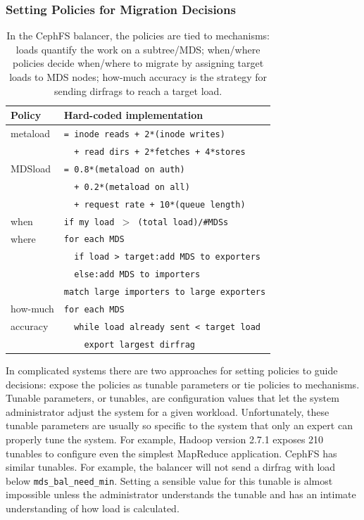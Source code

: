 \subsubsection{Setting Policies for Migration Decisions}
\label{setting-policies-for-migration-decisions}
\begin{table}[tb]
	\centering
	\begin{tabular}{ >{}p{1.5cm} | >{}p{6.8cm}}
		\centering\textbf{Policy} & \centering\textbf{Hard-coded implementation}
		\tabularnewline\hline		
		metaload	 	& \small{\texttt{= inode reads + 2*(inode writes)}}\tabularnewline
					 	& \small{\texttt{~~+ read dirs + 2*fetches + 4*stores}}\tabularnewline        
		MDSload      	& \small{\texttt{= 0.8*(metaload on auth)}}\tabularnewline
        				& \small{\texttt{~~+ 0.2*(metaload on all)}}\tabularnewline
        				& \small{\texttt{~~+ request rate + 10*(queue length)}}\tabularnewline
		when			& \small{\texttt{if my load \(>\) (total load)/\#MDSs}}\tabularnewline
        
		where			& \small{\texttt{for each MDS}}\tabularnewline	
          			& \small{\texttt{~~if load > target:add MDS to exporters}}
		\tabularnewline	& \small{\texttt{~~else:add MDS to importers}}
		\tabularnewline	& \small{\texttt{match large importers to large exporters}}\tabularnewline	
        
		how-much 		& \small{\texttt{for each MDS}}\tabularnewline
        accuracy		& \small{\texttt{~~while load already sent < target load}} \tabularnewline
        				& \small{\texttt{~~~~export largest dirfrag}}\tabularnewline
	\end{tabular}	
   	\caption{In the CephFS balancer, the policies are tied to mechanisms: loads quantify the work on a subtree/MDS; when/where policies decide when/where to migrate by assigning target loads to MDS nodes; how-much accuracy is the strategy for sending dirfrags to reach a target load.\label{table:policies}}    
\end{table}	

In complicated systems there are two approaches for setting policies to guide decisions: expose the policies as tunable parameters or tie policies to mechanisms. Tunable parameters, or tunables, are configuration values that let the system administrator adjust the system for a given workload. Unfortunately, these tunable parameters are usually so specific to the system that only an expert can properly tune the system. For example, Hadoop version 2.7.1 exposes 210 tunables to configure even the simplest MapReduce application. CephFS has similar tunables. For example, the balancer  will not send a dirfrag with load below \texttt{mds\_bal\_need\_min}. Setting a sensible value for this tunable is almost impossible unless the administrator understands the tunable and  has an intimate understanding of how load is calculated.

